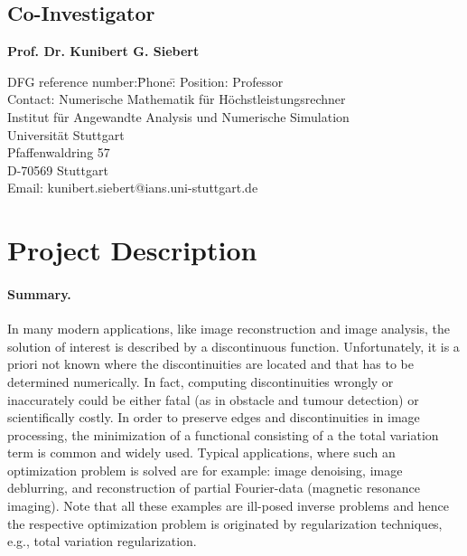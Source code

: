 \documentclass[enabledeprecatedfontcommands,cleardoublepage=empty,headsepline,twoside,11pt,DIV=15,BCOR=12mm,final]{scrartcl}
\begin{document}
\subsection*{Co-Investigator}

\begin{flushleft}
  \textbf{Prof. Dr. Kunibert G. Siebert}
  \begin{tabbing}
    DFG reference number:\quad\=Phone:\quad\=\kill
    Position:\> Professor\\
    Contact:\> Numerische Mathematik f\"ur H\"ochstleistungsrechner\\ 
    \>Institut f\"ur Angewandte Analysis und Numerische Simulation\\
    \> Universit\"at Stuttgart\\
    \> Pfaffenwaldring 57 \\
    \> D-70569 Stuttgart\\[1mm]
    \> Email:\> kunibert.siebert@ians.uni-stuttgart.de\\[1mm]
 \end{tabbing}
\end{flushleft}
\section*{Project Description}

\paragraph{Summary.} 

In many modern applications, like image reconstruction and image analysis, the solution of interest is described by a discontinuous function. Unfortunately, it is a priori not known where the discontinuities  are located and that has to be determined numerically. In fact, computing discontinuities wrongly or inaccurately could be either fatal (as in obstacle and tumour detection) or scientifically costly.  %
In order to preserve edges and discontinuities  in image processing, the minimization of a functional consisting of a the total variation term is common and widely used. Typical applications, where such an optimization problem is solved are for example: image denoising, image deblurring, and reconstruction of partial Fourier-data (magnetic resonance imaging). Note that all these examples are ill-posed inverse problems and hence the respective optimization problem is originated by regularization techniques, e.g., total variation regularization.
\end{document}
